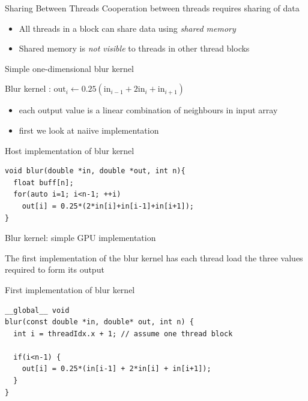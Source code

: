 \begin{frame}[fragile]{Sharing Between Threads}
        Cooperation between threads requires sharing of data
        \begin{itemize}
            \item All threads in a block can share data using \emph{shared memory}
            \item Shared memory is \emph{not visible} to threads in other thread blocks
        \end{itemize}

\end{frame}

\begin{frame}[fragile]{Simple one-dimensional blur kernel}
    \begin{info}{Blur kernel : $\text{out}_i \leftarrow 0.25(\text{in}_{i-1}+2\text{in}_i+\text{in}_{i+1})$}
        \begin{itemize}
            \item each output value is a linear combination of neighbours in input array
            \item first we look at naiive implementation
        \end{itemize}
    \end{info}

    \begin{code}{Host implementation of blur kernel}
        \begin{lstlisting}[style=boxcudatiny]
void blur(double *in, double *out, int n){
  float buff[n];
  for(auto i=1; i<n-1; ++i)
    out[i] = 0.25*(2*in[i]+in[i-1]+in[i+1]);
}
        \end{lstlisting}
    \end{code}

\end{frame}

\begin{frame}[fragile]{Blur kernel: simple GPU implementation}
    \begin{center}
        The first implementation of the blur kernel has each thread load the three values required to form its output
    \end{center}
    \begin{code}{First implementation of blur kernel}
        \begin{lstlisting}[style=boxcudatiny]
__global__ void
blur(const double *in, double* out, int n) {
  int i = threadIdx.x + 1; // assume one thread block

  if(i<n-1) {
    out[i] = 0.25*(in[i-1] + 2*in[i] + in[i+1]);
  }
}
        \end{lstlisting}
    \end{code}

\end{frame}

